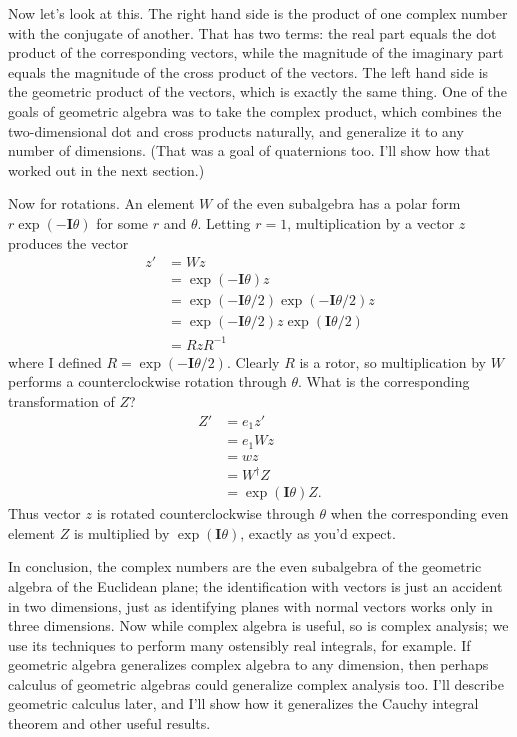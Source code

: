 \documentclass{utarticle}
\newcommand{\bl}[1]{\ensuremath{\bm{#1}}}
\newcommand{\I}{\bl{I}}
\newcommand{\rev}[1]{\ensuremath{#1^\dagger}}
\begin{document}
Now let's look at this.  The right hand side is the product of one complex 
number with the conjugate of another.  That has two terms: the real part 
equals the dot product of the corresponding vectors, while the magnitude of the
imaginary part equals the magnitude of the cross product of the vectors.  
The left hand side is the geometric product of the vectors, which is exactly the same thing.
One of the goals of geometric algebra was to take the complex product,
which combines the two-dimensional dot and cross products naturally, and
generalize it to any number of dimensions.  (That was a goal of quaternions too.
I'll show how that worked out in the next section.)

Now for rotations.  An element $W$ of the even subalgebra has a polar 
form $r\exp(-\I\theta)$ for some $r$ and $\theta$.  Letting $r=1$, multiplication 
by a vector $z$ produces the vector
\begin{align}
z' & = W z \nonumber \\
    & = \exp(-\I\theta) z \nonumber \\
    & = \exp(-\I\theta/2) \exp(-\I\theta/2) z \nonumber \\
    & = \exp(-\I\theta/2) z \exp(\I\theta/2) \nonumber \\
    & = R z R^{-1}
\end{align}
where I defined $R=\exp(-\I\theta/2)$.  Clearly $R$ is a rotor, so
multiplication by $W$ performs a counterclockwise rotation through
$\theta$.  What is the corresponding transformation of $Z$?
\begin{align}
Z' & = e_1 z' \nonumber \\
    & = e_1 W z \nonumber \\
    & = wz \nonumber \\
    & = \rev{W} Z \nonumber \\
    & = \exp(\I\theta) Z.
\end{align}
Thus vector $z$ is rotated counterclockwise through $\theta$ when the
corresponding even element $Z$ is multiplied by $\exp(\I\theta)$,
exactly as you'd expect.

In conclusion, the complex numbers are the even subalgebra 
of the geometric algebra of the Euclidean plane; the identification
with vectors is just an accident in two dimensions, just as
identifying planes with normal vectors works only in three
dimensions.  Now while complex algebra is useful, so is 
complex analysis; we use its techniques to perform many ostensibly
real integrals, for example.  If geometric algebra generalizes 
complex algebra to any dimension, then perhaps calculus of
geometric algebras could generalize complex analysis too.
I'll describe geometric calculus later, and I'll show how it generalizes 
the Cauchy integral theorem and other useful results.
\end{document}
